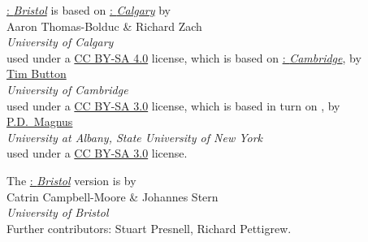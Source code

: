 \par



\newpage


\noindent
 \small  \href{\URL}{\forallx: \emph{Bristol}} is based on \href{https://forallx.openlogicproject.org/}{\forallx: \emph{Calgary}} by\\[2ex] {Aaron Thomas-Bolduc \& Richard Zach}\\
 \emph{University of Calgary}
 \\[2ex]
used under a \href{https://creativecommons.org/licenses/by-sa/4.0/}{CC BY-SA 4.0} license, which is based on \href{http://people.ds.cam.ac.uk/tecb2/forallx.shtml}{\forallx:\emph{ Cambridge}}, by\\[2ex]
\href{http://people.ds.cam.ac.uk/tecb2/index.shtml}{Tim Button}\\
\emph{University of Cambridge}\\[2ex]
used under a \href{https://creativecommons.org/licenses/by-sa/3.0/}{CC BY-SA 3.0} license, which is based in turn on \href{https://www.fecundity.com/logic/}{\forallx}, by\\[2ex]
\href{https://www.fecundity.com/job/}{P.D.\ Magnus}\\
\emph{University at Albany, State University of New York}\\[2ex]
used under a \href{https://creativecommons.org/licenses/by-sa/3.0/}{CC BY-SA 3.0} license.


\vfill


\noindent The \href{\URL}{\forallx: \emph{Bristol}} version is by 
\\[2ex] {Catrin Campbell-Moore \& Johannes Stern}\\\emph{University of Bristol}\\[2ex]
Further contributors: Stuart Presnell, Richard Pettigrew.

\vfill

